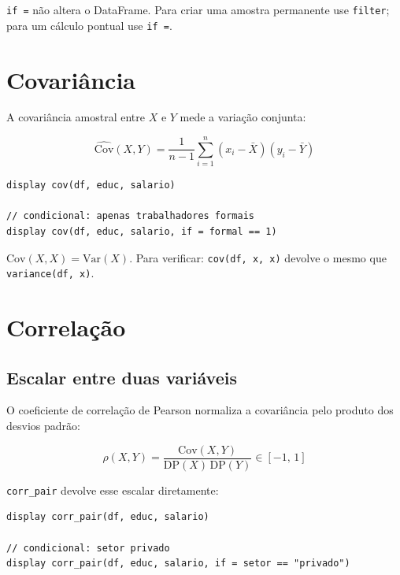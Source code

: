 \begin{dica}
  \lstinline{if =} não altera o DataFrame. Para criar uma amostra permanente
  use \lstinline{filter}; para um cálculo pontual use \lstinline{if =}.
\end{dica}

\section{Covariância}

A covariância amostral entre $X$ e $Y$ mede a variação conjunta:

\[
  \widehat{\mathrm{Cov}}(X, Y)
  = \frac{1}{n-1}\sum_{i=1}^{n}(x_i - \bar{X})(y_i - \bar{Y})
\]

\begin{lstlisting}[caption={Covariância entre duas colunas}]
display cov(df, educ, salario)

// condicional: apenas trabalhadores formais
display cov(df, educ, salario, if = formal == 1)
\end{lstlisting}

\begin{nota}
  $\mathrm{Cov}(X, X) = \mathrm{Var}(X)$. Para verificar:
  \lstinline{cov(df, x, x)} devolve o mesmo que \lstinline{variance(df, x)}.
\end{nota}

\section{Correlação}

\subsection{Escalar entre duas variáveis}

O coeficiente de correlação de Pearson normaliza a covariância pelo produto dos
desvios padrão:

\[
  \rho(X, Y) = \frac{\mathrm{Cov}(X,Y)}{\mathrm{DP}(X)\,\mathrm{DP}(Y)}
  \in [-1,\, 1]
\]

\lstinline{corr_pair} devolve esse escalar diretamente:

\begin{lstlisting}[caption={Correlação escalar}]
display corr_pair(df, educ, salario)

// condicional: setor privado
display corr_pair(df, educ, salario, if = setor == "privado")
\end{lstlisting}

